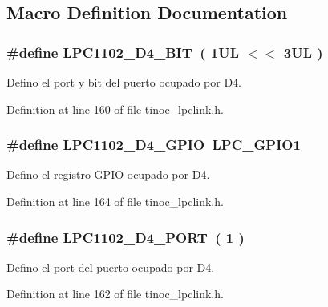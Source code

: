 \subsection{Macro Definition Documentation}
\subsubsection[{\texorpdfstring{L\+P\+C1102\+\_\+\+D4\+\_\+\+B\+IT}{LPC1102_D4_BIT}}]{\setlength{\rightskip}{0pt plus 5cm}\#define L\+P\+C1102\+\_\+\+D4\+\_\+\+B\+IT~( 1\+U\+L $<$$<$ 3\+U\+L )}\hypertarget{group___p_i_n_d4_ga9654c36aa00f501fb2cec682f6aa84c4}{}\label{group___p_i_n_d4_ga9654c36aa00f501fb2cec682f6aa84c4}


Defino el port y bit del puerto ocupado por D4. 



Definition at line 160 of file tinoc\+\_\+lpclink.\+h.

\subsubsection[{\texorpdfstring{L\+P\+C1102\+\_\+\+D4\+\_\+\+G\+P\+IO}{LPC1102_D4_GPIO}}]{\setlength{\rightskip}{0pt plus 5cm}\#define L\+P\+C1102\+\_\+\+D4\+\_\+\+G\+P\+IO~L\+P\+C\+\_\+\+G\+P\+I\+O1}\hypertarget{group___p_i_n_d4_ga6ca2b1173d8c6e4ca72a10d780fdfd80}{}\label{group___p_i_n_d4_ga6ca2b1173d8c6e4ca72a10d780fdfd80}


Defino el registro G\+P\+IO ocupado por D4. 



Definition at line 164 of file tinoc\+\_\+lpclink.\+h.

\subsubsection[{\texorpdfstring{L\+P\+C1102\+\_\+\+D4\+\_\+\+P\+O\+RT}{LPC1102_D4_PORT}}]{\setlength{\rightskip}{0pt plus 5cm}\#define L\+P\+C1102\+\_\+\+D4\+\_\+\+P\+O\+RT~( 1 )}\hypertarget{group___p_i_n_d4_ga58a788705aa9b7850deb5fa19cfd856c}{}\label{group___p_i_n_d4_ga58a788705aa9b7850deb5fa19cfd856c}


Defino el port del puerto ocupado por D4. 



Definition at line 162 of file tinoc\+\_\+lpclink.\+h.

